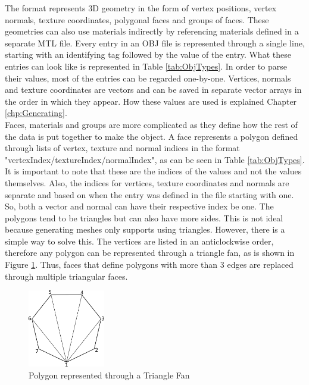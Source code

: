 The format represents 3D geometry in the form of vertex positions, vertex normals, texture coordinates, polygonal faces and groups of faces. These geometries can also use materials indirectly by referencing materials defined in a separate \acs{MTL} file. Every entry in an OBJ file is represented through a single line, starting with an identifying tag followed by the value of the entry. What these entries can look like is represented in Table \ref{tab:ObjTypes}.
In order to parse their values, most of the entries can be regarded one-by-one. Vertices, normals and texture coordinates are vectors and can be saved in separate vector arrays in the order in which they appear. How these values are used is explained Chapter \ref{chp:Generating}.\\
Faces, materials and groups are more complicated as they define how the rest of the data is put together to make the object. A face represents a polygon defined through lists of vertex, texture and normal indices in the format "vertexIndex/textureIndex/normalIndex", as can be seen in Table \ref{tab:ObjTypes}. It is important to note that these are the indices of the values and not the values themselves. Also, the indices for vertices, texture coordinates and normals are separate and based on when the entry was defined in the file starting with one. So, both a vector and normal can have their respective index be one. The polygons tend to be triangles but can also have more sides. This is not ideal because generating meshes only supports using triangles. However, there is a simple way to solve this. The vertices are listed in an anticlockwise order, therefore any polygon can be represented through a triangle fan, as is shown in Figure \ref{fig:TriangleFan}. Thus, faces that define polygons with more than 3 edges are replaced through multiple triangular faces.

\begin{figure}[htpb]
	\centering
	\includegraphics[width=0.3\textwidth]{fig/TriangleFan.pdf}
	\caption[OBJ Polygon to Triangle Fan]{Polygon represented through a Triangle Fan\protect}
	\label{fig:TriangleFan}
\end{figure}

